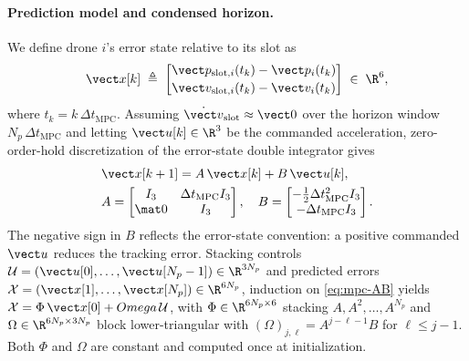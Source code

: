 \paragraph{Prediction model and condensed horizon.}
We define drone $i$'s error state relative to its slot as
\begin{equation}
  \vect x[k] \;\triangleq\;
    \begin{bmatrix}
      \vect p_{\mathrm{slot},i}(t_k) - \vect p_i(t_k) \\[2pt]
      \vect v_{\mathrm{slot},i}(t_k) - \vect v_i(t_k)
    \end{bmatrix}
    \;\in\; \R^6,
  \label{eq:mpc-x}
\end{equation}
where $t_k = k\,\Delta t_{\mathrm{MPC}}$. Assuming $\dot{\vect v}_{\mathrm{slot}} \approx \vect 0$ over the horizon window $N_p\,\Delta t_{\mathrm{MPC}}$ and letting $\vect u[k] \in \R^3$ be the commanded acceleration, zero-order-hold discretization of the error-state double integrator gives
\begin{align}
  \label{eq:mpc-AB}
  &\vect x[k+1] = A\,\vect x[k] + B\,\vect u[k],\\
  &A = \begin{bmatrix} I_3 & \Delta t_{\mathrm{MPC}} I_3 \\
                       \mat 0 & I_3 \end{bmatrix},\quad
  B = \begin{bmatrix}
        -\tfrac{1}{2}\Delta t_{\mathrm{MPC}}^2 I_3 \\
        -\Delta t_{\mathrm{MPC}} I_3
      \end{bmatrix}.\nonumber
\end{align}
The negative sign in $B$ reflects the error-state convention: a positive commanded $\vect u$ reduces the tracking error. Stacking controls $\mathcal{U} = (\vect u[0], \dots, \vect u[N_p-1]) \in \R^{3N_p}$ and predicted errors $\mathcal{X} = (\vect x[1], \dots, \vect x[N_p]) \in \R^{6N_p}$, induction on \eqref{eq:mpc-AB} yields $\mathcal{X} = \Phi\,\vect x[0] +  Omega\,\mathcal{U}$, with $\Phi \in \R^{6N_p \times 6}$ stacking $A, A^2, \dots, A^{N_p}$
and $\Omega \in \R^{6N_p \times 3N_p}$ block lower-triangular with $(\Omega)_{j,\ell} = A^{j-\ell-1} B$ for $\ell \le j-1$. Both $\Phi$ and $\Omega$ are constant and computed once at initialization.


